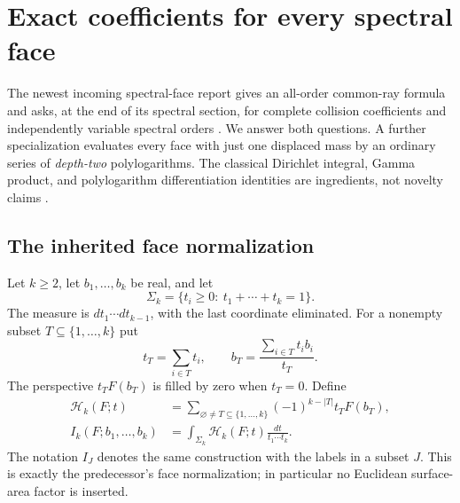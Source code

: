 
\section{Exact coefficients for every spectral face}
\label{sfj:sec:faces}

The newest incoming spectral-face report gives an all-order common-ray
formula and asks, at the end of its spectral section, for complete
collision coefficients and independently variable spectral orders
\cite{RepoBernoulli}.  We answer both questions.  A further
specialization evaluates every face with just one displaced mass by
an ordinary series of \emph{depth-two} polylogarithms.  The classical
Dirichlet integral, Gamma product, and polylogarithm differentiation
identities are ingredients, not novelty claims
\cite{Carlson,DLMF}.

\subsection{The inherited face normalization}

Let $k\ge2$, let $b_1,\ldots,b_k$ be real, and let
\[
 \Sigma_k=\{t_i\ge0:\ t_1+\cdots+t_k=1\}.
\]
The measure is $dt_1\cdots dt_{k-1}$, with the last coordinate
eliminated.  For a nonempty subset $T\subseteq\{1,\ldots,k\}$ put
\[
 t_T=\sum_{i\in T}t_i,\qquad
 b_T=\frac{\sum_{i\in T}t_i b_i}{t_T}.
\]
The perspective $t_TF(b_T)$ is filled by zero when $t_T=0$.  Define
\begin{align}
 \mathcal H_k(F;t)&=
 \sum_{\varnothing\ne T\subseteq\{1,\ldots,k\}}
       (-1)^{k-|T|}t_TF(b_T),\label{sfj:eq:face}\\
 I_k(F;b_1,\ldots,b_k)&=
 \int_{\Sigma_k}\mathcal H_k(F;t)\frac{dt}{t_1\cdots t_k}.
 \label{sfj:eq:I}
\end{align}
The notation $I_J$ denotes the same construction with the labels in a
subset $J$.  This is exactly the predecessor's face normalization; in
particular no Euclidean surface-area factor is inserted.

